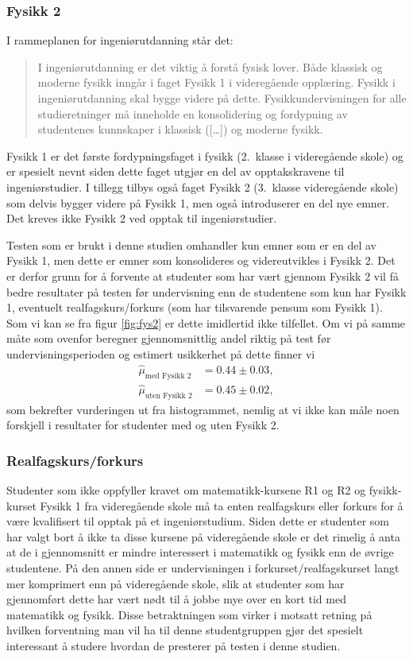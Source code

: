 \documentclass[a4paper,norsk,12pt]{article}
\begin{document}
\subsubsection{Fysikk 2}
I rammeplanen for ingeniørutdanning \cite{rammeplan} står det:
\begin{quote}I ingeniørutdanning er det viktig å forstå fysisk lover. Både klassisk og moderne fysikk inngår i faget Fysikk 1 i videregående opplæring. Fysikk i ingeniørutdanning skal bygge videre på dette. Fysikkundervisningen for alle studieretninger må inneholde en konsolidering og fordypning av studentenes kunnskaper i klassisk ([\ldots]) og moderne fysikk.\end{quote}
Fysikk 1 er det første fordypningsfaget i fysikk (2.~klasse i videregående skole) og er spesielt nevnt siden dette faget utgjør en del av opptakskravene til ingeniørstudier. I tillegg tilbys også faget Fysikk 2 (3.~klasse videregående skole) som delvis bygger videre på Fysikk 1, men også introduserer en del nye emner. Det kreves ikke Fysikk 2 ved opptak til ingeniørstudier. 

Testen som er brukt i denne studien omhandler kun emner som er en del av Fysikk 1, men dette er emner som konsolideres og videreutvikles i Fysikk 2. Det er derfor grunn for å forvente at studenter som har vært gjennom Fysikk 2 vil få bedre resultater på testen før undervisning enn de studentene som kun har Fysikk 1, eventuelt realfagskurs/forkurs (som har tilsvarende pensum som Fysikk 1). Som vi kan se fra figur \ref{fig:fys2} er dette imidlertid ikke tilfellet. Om vi på samme måte som ovenfor beregner gjennomsnittlig andel riktig på test før undervisningsperioden og estimert usikkerhet på dette finner vi
\begin{displaymath}
\begin{aligned}
	\hat{\mu}_\text{med Fysikk 2} &= 0.44\pm 0.03, \\
	\hat{\mu}_\text{uten Fysikk 2} &= 0.45\pm 0.02,
\end{aligned}
\end{displaymath}
som bekrefter vurderingen ut fra histogrammet, nemlig at vi ikke kan måle noen forskjell i resultater for studenter med og uten Fysikk 2. 


\subsubsection{Realfagskurs/forkurs}
Studenter som ikke oppfyller kravet om matematikk-kursene R1 og R2 og fysikk-kurset Fysikk 1 fra videregående skole må ta enten realfagskurs eller forkurs for å være kvalifisert til opptak på et ingeniørstudium. Siden dette er studenter som har valgt bort å ikke ta disse kursene på videregående skole er det rimelig å anta at de i gjennomsnitt er mindre interessert i matematikk og fysikk enn de øvrige studentene. På den annen side er undervisningen i forkurset/realfagskurset langt mer komprimert enn på videregående skole, slik at studenter som har gjennomført dette har vært nødt til å jobbe mye over en kort tid med matematikk og fysikk. Disse betraktningen som virker i motsatt retning på hvilken forventning man vil ha til denne studentgruppen gjør det spesielt interessant å studere hvordan de presterer på testen i denne studien.
\end{document}
